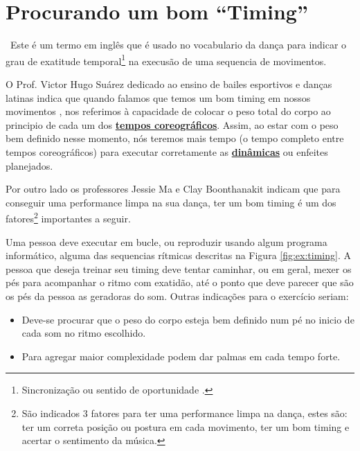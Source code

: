 
\section{Procurando um bom ``Timing''}
\label{sec:dancetimming}

\begin{definition}[Timing]~Este é um termo em inglês que é usado no vocabulario da dança 
para indicar o grau de exatitude temporal\footnote{%
Sincronização ou
sentido de oportunidade \cite{TimingDef}.} 
na execusão de uma sequencia de movimentos.%
\end{definition}

O Prof. Victor Hugo Suárez dedicado ao ensino de bailes esportivos e danças latinas 
indica que quando falamos que temos um bom timing em nossos movimentos \cite{TimingDef2}, 
nos referimos à capacidade de colocar o peso total do corpo ao principio de cada um dos
\hyperref[def:tempocoreografico]{\textbf{tempos coreográficos}}. 
Assim, ao estar com o peso bem definido nesse momento, nós teremos mais tempo 
(o tempo completo entre tempos coreográficos) 
para executar corretamente as \hyperref[sec:musicalidade:dinamicas]{\textbf{dinâmicas}} ou 
enfeites planejados.

Por outro lado os professores Jessie Ma e Clay Boonthanakit
indicam \cite{TimingDef3} que para conseguir uma performance limpa na sua dança,
ter um bom timing é
um dos fatores\footnote{São indicados 3 fatores para ter uma performance limpa na dança,
estes são: ter um correta posição ou postura em cada movimento, ter um bom timing e 
acertar o sentimento da música.} importantes a seguir.

\begin{example}
\label{ex:timing1}
Uma pessoa deve executar em bucle, ou reproduzir usando algum programa informático,
alguma das sequencias rítmicas descritas na Figura \ref{fig:ex:timing}.
A pessoa que deseja treinar seu timing deve tentar caminhar, ou em geral, 
mexer os pés para acompanhar o ritmo com exatidão,
até o ponto que deve parecer que são os pés da pessoa as geradoras do som.
Outras indicações para o exercício seriam:
\begin{itemize}
\item Deve-se procurar que o peso do corpo esteja bem definido num pé
no inicio de cada som no ritmo escolhido.
\item Para agregar maior complexidade podem dar palmas em cada tempo forte.
\end{itemize}
\vspace{-10pt}
\end{example}


